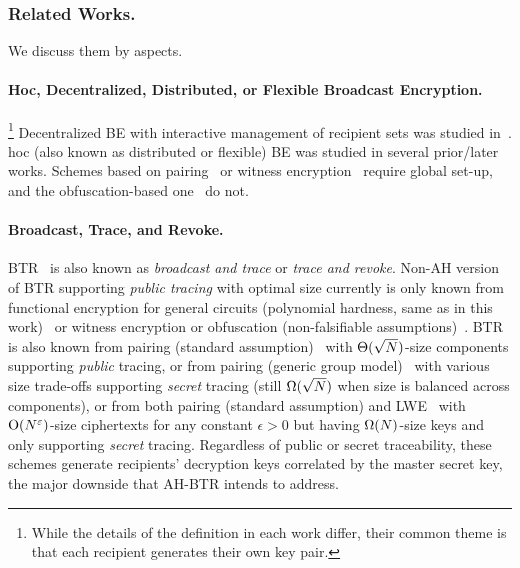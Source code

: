 \subsubsection{Related Works.}
We discuss them by aspects.

\paragraph{\Ad Hoc, Decentralized, Distributed, or Flexible
Broadcast Encryption.}
\leavevmode\unskip\footnote{
While the details of the definition in each work differ,
their common theme is that each recipient generates their own key pair.}
Decentralized BE
with interactive management of recipient sets
was studied in~\cite{SCN:PhaPoiStr12,PAIRING:DelPaiPoi07}.
\Ad hoc (also known as distributed or flexible) BE
was studied in several prior/later works.
Schemes based on
pairing~\cite{DHMR08,CCS:WQZD10,AC:KolMalWee23} or
witness encryption~\cite{C:FreWatWu23}
require global set-up, and
the obfuscation-based one~\cite{C:BonZha14} do not.

\paragraph{Broadcast, Trace, and Revoke.}
BTR~\cite{FC:NaoPin00-withdoi,C:NaoNaoLot01} is also known as
\emph{broadcast and trace} or \emph{trace and revoke}.
Non-AH version of BTR supporting \emph{public tracing} with optimal size
currently is only known from
functional encryption for general circuits
(polynomial hardness, same as in this work)~\cite{EC:AKYY23,EC:JaiLinLuo23}
or witness encryption or obfuscation
(non-falsifiable assumptions)~\cite{EC:NisWicZha16,PKC:GoyVusWat19}.
BTR is also known
from pairing (standard assumption)~\cite{CCS:BonWat06,CCS:GKSW10}
with $\operatorname{\Theta}(\sqrt{N})$-size components supporting \emph{public} tracing,
or from pairing (generic group model)~\cite{C:Zhandry20}
with various size trade-offs supporting \emph{secret} tracing
(still $\operatorname{\Omega}(\sqrt{N})$ when size is balanced across components),
or from both pairing (standard assumption) and LWE~\cite{C:GQWW19}
with $\operatorname{O}(N^\varepsilon)$-size ciphertexts for any constant ${\epsilon>0}$
but having $\operatorname{\Omega}(N)$-size keys and only supporting \emph{secret} tracing.
Regardless of public or secret traceability,
these schemes generate recipients' decryption keys
correlated by the master secret key,
the major downside that AH-BTR intends to address.

